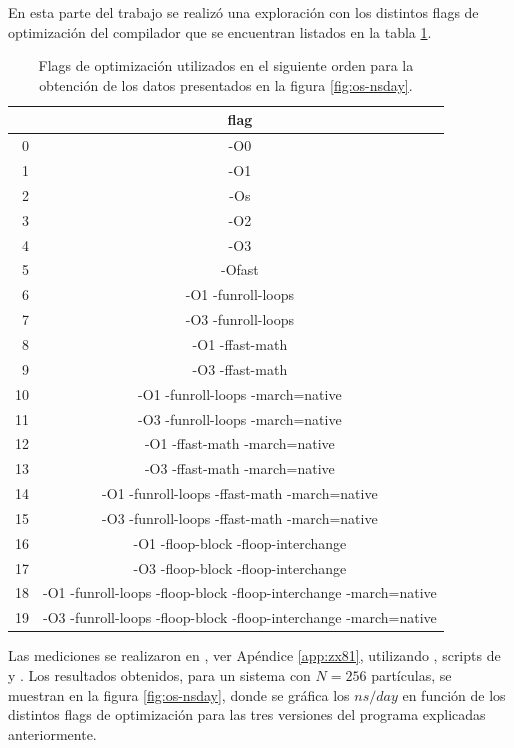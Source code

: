 \documentclass[a4paper,spanish,12pt,twoside]{article}
\begin{document}
En esta parte del trabajo se realizó una exploración con los distintos flags de optimización del compilador  que se encuentran listados en la tabla \ref{tab:os-flags}.
\begin{table}[h]
	\centering
	\caption{Flags de optimización utilizados en el siguiente orden para la obtención de los datos presentados en la figura \ref{fig:os-nsday}.}
	\label{tab:os-flags}
	\begin{tabular}{|r|c|}
		\hline
		& flag \\ \hline
		0 & -O0  \\
		1 & -O1  \\
		2 & -Os  \\
		3 & -O2  \\
		4 & -O3  \\
		5 & -Ofast \\
		6 & -O1 -funroll-loops \\
		7 & -O3 -funroll-loops \\
		8 & -O1 -ffast-math \\
		9 & -O3 -ffast-math \\
		10 & -O1 -funroll-loops -march=native \\
		11 & -O3 -funroll-loops -march=native \\
		12 & -O1 -ffast-math -march=native \\
		13 & -O3 -ffast-math -march=native \\
		14 & -O1 -funroll-loops -ffast-math -march=native \\
		15 & -O3 -funroll-loops -ffast-math -march=native \\
		16 & -O1 -floop-block -floop-interchange \\
		17 & -O3 -floop-block -floop-interchange \\
		18 & -O1 -funroll-loops -floop-block -floop-interchange -march=native \\
		19 & -O3 -funroll-loops -floop-block -floop-interchange -march=native \\
		\hline
	\end{tabular}
\end{table}
Las mediciones se realizaron en , ver Apéndice \ref{app:zx81}, utilizando , scripts de  y . Los resultados obtenidos, para un sistema con $N=256$ partículas, se muestran en la figura \ref{fig:os-nsday}, donde se gráfica los $ns/day$ en función de los distintos flags de optimización para las tres versiones del programa explicadas anteriormente.
\end{document}
